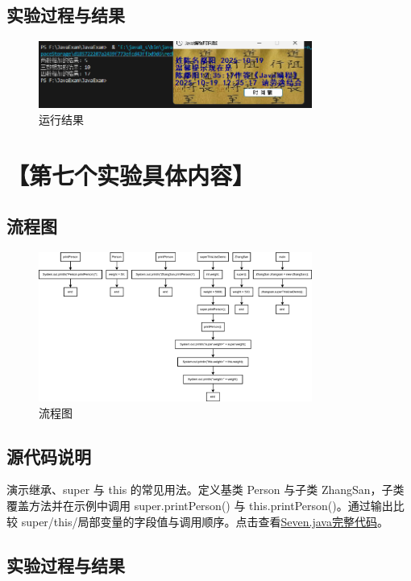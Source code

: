 \documentclass[12pt,a4paper]{article}
\begin{document}
\subsection*{实验过程与结果}

\begin{figure}[H]
\centering
\includegraphics[width=0.8\textwidth,height=0.8\textheight,keepaspectratio]{sixa.png}
\caption{运行结果}
\end{figure}

\section*{【第七个实验具体内容】}
\subsection*{流程图}

\begin{figure}[H]
\centering
\includegraphics[width=0.8\textwidth,height=0.8\textheight,keepaspectratio]{sevena1.png}
\caption{流程图}
\end{figure}

\subsection*{源代码说明}
演示继承、super 与 this 的常见用法。定义基类 Person 与子类 ZhangSan，子类覆盖方法并在示例中调用 super.printPerson() 与 this.printPerson()。通过输出比较 super/this/局部变量的字段值与调用顺序。点击查看\hyperref[sec:seven]{Seven.java完整代码}。


\subsection*{实验过程与结果}
\end{document}
